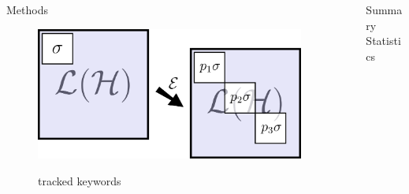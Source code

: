 \documentclass[final]{beamer}
\newlength{\sepwid}
\newlength{\onecolwid}
\newlength{\twocolwid}
\begin{document}
\begin{frame}[t]
\begin{columns}[t]
\begin{column}{\onecolwid}
\begin{block}{Methods}
{          \begin{figure}
          \begin{center}
            \includegraphics[width=10in]{code.png} \\
            \caption{tracked keywords}
            \label{fig:keywords}
          \end{center}
        \end{figure}}
      \end{block}
    \end{column}

    \begin{column}{\sepwid}\end{column}   %
    \begin{column}{\twocolwid}    %
      \begin{columns}[t,totalwidth=\twocolwid] %
        \begin{column}{\onecolwid}\vspace{-.69in}
          \begin{block}{Summary Statistics}


\end{block}
\end{column}
\end{columns}
\end{column}
\end{columns}
\end{frame}
\end{document}
